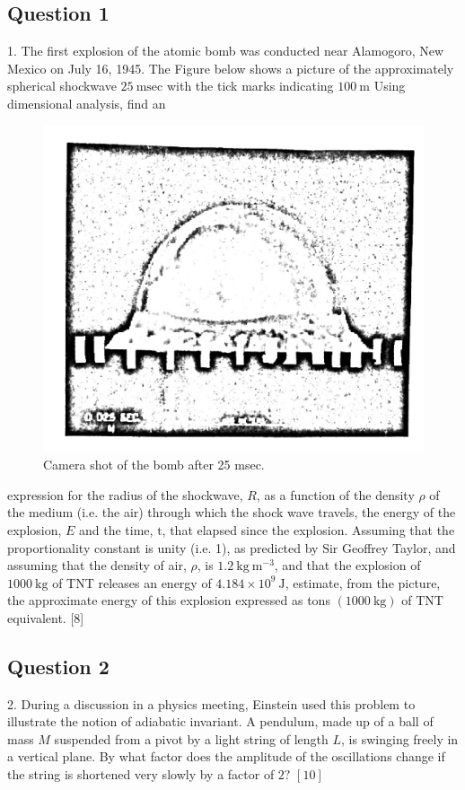 \documentclass{article}
\begin{document}
\subsection{Question 1}
1. The first explosion of the atomic bomb was conducted near Alamogoro, New Mexico on July 16, 1945. The Figure below shows a picture of the approximately spherical shockwave $25 \mathrm{~msec}$ with the tick marks indicating $100 \mathrm{~m}$ Using dimensional analysis, find an

\begin{figure}
	\centering
	\includegraphics[width=0.5\linewidth]{spho_book_TYS_images/2013q1.png}
	\caption{Camera shot of the bomb after 25 msec.}
\end{figure}

expression for the radius of the shockwave, $R$, as a function of the density $\rho$ of the medium (i.e. the air) through which the shock wave travels, the energy of the explosion, $E$ and the time, $\mathrm{t}$, that elapsed since the explosion.
Assuming that the proportionality constant is unity (i.e. 1), as predicted by Sir Geoffrey Taylor, and assuming that the density of air, $\rho$, is $1.2 \mathrm{~kg} \mathrm{~m}^{-3}$, and that the explosion of $1000 \mathrm{~kg}$ of TNT releases an energy of $4.184 \times 10^{9} \mathrm{~J}$, estimate, from the picture, the approximate energy of this explosion expressed as tons $(1000 \mathrm{~kg})$ of TNT equivalent. [8]

\subsection{Question 2}

2. During a discussion in a physics meeting, Einstein used this problem to illustrate the notion of adiabatic invariant. A pendulum, made up of a ball of mass $M$ suspended from a pivot by a light string of length $L$, is swinging freely in a vertical plane. By what factor does the amplitude of the oscillations change if the string is shortened very slowly by a factor of $2 ?$
$[10]$
\end{document}
